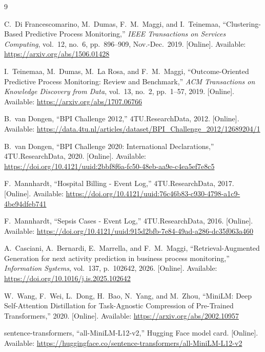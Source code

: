 \begin{thebibliography}{9}

\label{bib:dfm2015}
C.~Di Francescomarino, M.~Dumas, F.~M.~Maggi, and I.~Teinemaa,
``Clustering-Based Predictive Process Monitoring,''
\textit{IEEE Transactions on Services Computing},
vol.~12, no.~6, pp.~896--909, Nov.-Dec.~2019.
[Online]. Available: \url{https://arxiv.org/abs/1506.01428}

\label{bib:teinemaa2018}
I.~Teinemaa, M.~Dumas, M.~La Rosa, and F.~M.~Maggi,
``Outcome-Oriented Predictive Process Monitoring: Review and Benchmark,''
\textit{ACM Transactions on Knowledge Discovery from Data},
vol.~13, no.~2, pp.~1--57, 2019.
[Online]. Available: \url{https://arxiv.org/abs/1707.06766}

\label{bib:bpi2012dataset}
B.~van Dongen,
``BPI Challenge 2012,''
4TU.ResearchData, 2012.
[Online]. Available: \url{https://data.4tu.nl/articles/dataset/BPI_Challenge_2012/12689204/1}

\label{bib:bpi2020intl}
B.~van Dongen,
``BPI Challenge 2020: International Declarations,''
4TU.ResearchData, 2020.
[Online]. Available: \url{https://doi.org/10.4121/uuid:2bbf8f6a-fc50-48eb-aa9e-c4ea5ef7e8c5}

\label{bib:hospitalbillingdataset}
F.~Mannhardt,
``Hospital Billing - Event Log,''
4TU.ResearchData, 2017.
[Online]. Available: \url{https://doi.org/10.4121/uuid:76c46b83-c930-4798-a1c9-4be94dfeb741}

\label{bib:sepsisdataset}
F.~Mannhardt,
``Sepsis Cases - Event Log,''
4TU.ResearchData, 2016.
[Online]. Available: \url{https://doi.org/10.4121/uuid:915d2bfb-7e84-49ad-a286-dc35f063a460}

\label{bib:casciani2026rag}
A.~Casciani, A.~Bernardi, E.~Marrella, and F.~M.~Maggi,
``Retrieval-Augmented Generation for next activity prediction in business process monitoring,''
\textit{Information Systems},
vol.~137, p.~102642, 2026.
[Online]. Available: \url{https://doi.org/10.1016/j.is.2025.102642}

\label{bib:minilmpaper}
W.~Wang, F.~Wei, L.~Dong, H.~Bao, N.~Yang, and M.~Zhou,
``MiniLM: Deep Self-Attention Distillation for Task-Agnostic Compression of Pre-Trained Transformers,''
2020.
[Online]. Available: \url{https://arxiv.org/abs/2002.10957}

\label{bib:minilmhf}
sentence-transformers,
``all-MiniLM-L12-v2,''
Hugging Face model card.
[Online]. Available: \url{https://huggingface.co/sentence-transformers/all-MiniLM-L12-v2}


\end{thebibliography}
